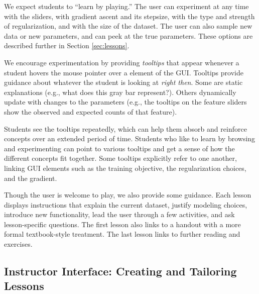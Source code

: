 \documentclass[11pt,letterpaper]{article}
\begin{document}
We expect students to ``learn by playing.''  The user can experiment
at any time with the sliders, with gradient ascent and its stepsize,
with the type and strength of regularization, and with the size of the
dataset.  The user can also sample new data or new parameters, and can
peek at the true parameters.  These options are described further
in Section \ref{sec:lessons}.


We encourage experimentation by providing \textit{tooltips} that
appear whenever a student hovers the mouse pointer over a element of
the GUI.  Tooltips provide guidance about whatever the student is
looking at \textit{right then}.  Some are static explanations (e.g.,
what does this gray bar represent?).  Others dynamically update with
changes to the parameters (e.g., the tooltips on the feature sliders
show the observed and expected counts of that feature).

Students see the tooltips repeatedly, which can help them absorb and
reinforce concepts over an extended period of time.  Students who like
to learn by browsing and experimenting can point to various tooltips
and get a sense of how the different concepts fit together.  Some
tooltips explicitly refer to one another, linking GUI elements such as
the training objective, the regularization choices, and the gradient.


Though the user is welcome to play, we also provide some guidance.
Each lesson displays instructions that explain the current dataset,
justify modeling choices, introduce new functionality, lead the user
through a few activities, and ask lesson-specific questions.  The
first lesson also links to a handout with a more formal textbook-style
treatment.  The last lesson links to further reading and exercises.



\subsection{Instructor Interface: Creating and Tailoring Lessons}\label{sec:tailoring}
\end{document}
